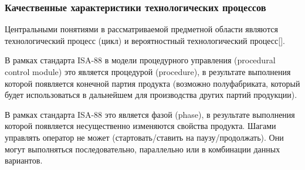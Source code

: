 \subsubsection{Качественные характеристики технологических процессов}

Центральными понятиями в рассматриваемой предметной области являются технологический процесс (цикл) и вероятностный технологический процесс[].

\begin{SCn}
\end{SCn}

В рамках стандарта ISA-88 в модели процедурного управления (procedural control module) это является процедурой (procedure), в результате выполнения которой появляется конечной партия продукта (возможно полуфабриката, который будет использоваться в дальнейшем для производства других партий продукции). 

\begin{SCn}
\end{SCn}

\begin{SCn}
\end{SCn}

В рамках стандарта ISA-88 это является фазой (phase), в результате выполнения которой появляется несущественно изменяются свойства продукта. Шагами управлять оператор не может (стартовать/ставить на паузу/продолжать). Они могут выполняться последовательно, параллельно или в комбинации данных вариантов.


